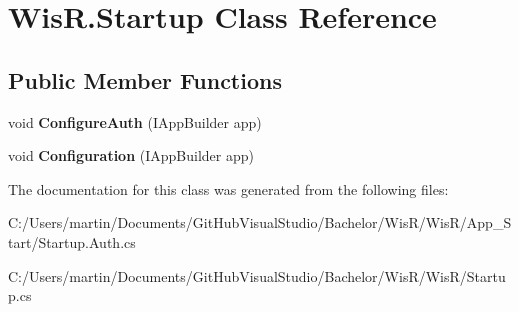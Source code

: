 \hypertarget{class_wis_r_1_1_startup}{}\section{Wis\+R.\+Startup Class Reference}
\label{class_wis_r_1_1_startup}
\subsection*{Public Member Functions}
\begin{DoxyCompactItemize}
\item 
\hypertarget{class_wis_r_1_1_startup_a14b90c7fb8351a825126e9491e9f9b73}{}void {\bfseries Configure\+Auth} (I\+App\+Builder app)\label{class_wis_r_1_1_startup_a14b90c7fb8351a825126e9491e9f9b73}

\item 
\hypertarget{class_wis_r_1_1_startup_a2f64192a5403ad0e7452154715ef3274}{}void {\bfseries Configuration} (I\+App\+Builder app)\label{class_wis_r_1_1_startup_a2f64192a5403ad0e7452154715ef3274}

\end{DoxyCompactItemize}


The documentation for this class was generated from the following files\+:\begin{DoxyCompactItemize}
\item 
C\+:/\+Users/martin/\+Documents/\+Git\+Hub\+Visual\+Studio/\+Bachelor/\+Wis\+R/\+Wis\+R/\+App\+\_\+\+Start/Startup.\+Auth.\+cs\item 
C\+:/\+Users/martin/\+Documents/\+Git\+Hub\+Visual\+Studio/\+Bachelor/\+Wis\+R/\+Wis\+R/Startup.\+cs\end{DoxyCompactItemize}
